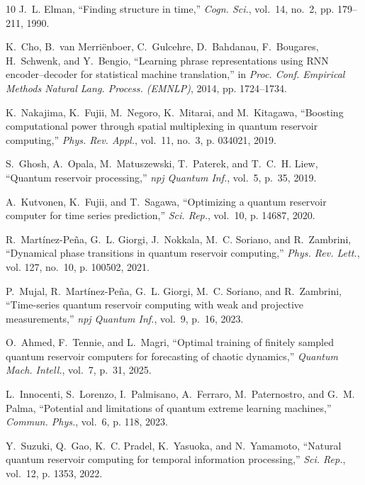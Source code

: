\documentclass[journal]{IEEEtran}
\begin{document}
\begin{thebibliography}{10}
J.~L. Elman, ``Finding structure in time,'' \emph{Cogn. Sci.}, vol.~14, no.~2,
  pp. 179--211, 1990.

K.~Cho, B.~van Merri{\"e}nboer, C.~Gulcehre, D.~Bahdanau, F.~Bougares,
  H.~Schwenk, and Y.~Bengio, ``Learning phrase representations using {RNN}
  encoder--decoder for statistical machine translation,'' in \emph{Proc. Conf.
  Empirical Methods Natural Lang. Process. (EMNLP)}, 2014, pp. 1724--1734.

K.~Nakajima, K.~Fujii, M.~Negoro, K.~Mitarai, and M.~Kitagawa, ``Boosting
  computational power through spatial multiplexing in quantum reservoir
  computing,'' \emph{Phys. Rev. Appl.}, vol.~11, no.~3, p. 034021, 2019.

S.~Ghosh, A.~Opala, M.~Matuszewski, T.~Paterek, and T.~C.~H. Liew, ``Quantum
  reservoir processing,'' \emph{npj Quantum Inf.}, vol.~5, p.~35, 2019.

A.~Kutvonen, K.~Fujii, and T.~Sagawa, ``Optimizing a quantum reservoir computer
  for time series prediction,'' \emph{Sci. Rep.}, vol.~10, p. 14687, 2020.

R.~Mart{\'i}nez-Pe{\~n}a, G.~L. Giorgi, J.~Nokkala, M.~C. Soriano, and
  R.~Zambrini, ``Dynamical phase transitions in quantum reservoir computing,''
  \emph{Phys. Rev. Lett.}, vol. 127, no.~10, p. 100502, 2021.

P.~Mujal, R.~Mart{\'i}nez-Pe{\~n}a, G.~L. Giorgi, M.~C. Soriano, and
  R.~Zambrini, ``Time-series quantum reservoir computing with weak and
  projective measurements,'' \emph{npj Quantum Inf.}, vol.~9, p.~16, 2023.

O.~Ahmed, F.~Tennie, and L.~Magri, ``Optimal training of finitely sampled
  quantum reservoir computers for forecasting of chaotic dynamics,''
  \emph{Quantum Mach. Intell.}, vol.~7, p.~31, 2025.

L.~Innocenti, S.~Lorenzo, I.~Palmisano, A.~Ferraro, M.~Paternostro, and G.~M.
  Palma, ``Potential and limitations of quantum extreme learning machines,''
  \emph{Commun. Phys.}, vol.~6, p. 118, 2023.

Y.~Suzuki, Q.~Gao, K.~C. Pradel, K.~Yasuoka, and N.~Yamamoto, ``Natural quantum
  reservoir computing for temporal information processing,'' \emph{Sci. Rep.},
  vol.~12, p. 1353, 2022.


\end{thebibliography}
\end{document}
